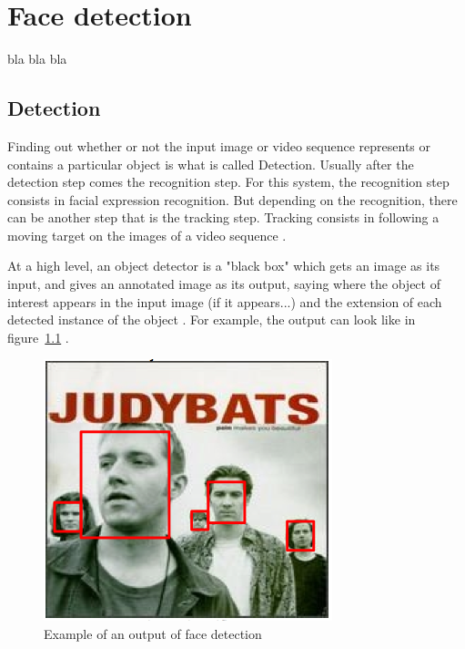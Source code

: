 \chapter{Face detection}

\noindent bla bla bla
\newline

\section{Detection}

\noindent Finding out whether or not the input image or video sequence represents or contains a particular object is what is called Detection. Usually after the detection step comes the recognition step. For this system, the recognition step consists in facial expression recognition. But depending on the recognition, there can be another step that is the tracking step. Tracking consists in following a moving target on the images of a video sequence \cite{DIN08}.
\newline

\noindent At a high level, an object detector is a "black box" which gets an image as its input, and gives an annotated image as its output, saying where the object of interest appears in the input image (if it appears...) and the extension of each detected instance of the object \cite{DIN08}. For example, the output can look like in figure~\ref{output_example_face_detection} \cite{DIN08}.
\newline

\begin{figure}[!h]
\begin{center}
\noindent \includegraphics[scale=0.7]{figures/output_example_face_detection} 
\newline
\caption{Example of an output of face detection}
\label{output_example_face_detection}
\end{center} 
\end{figure}

